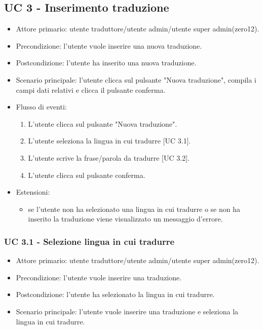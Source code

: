 \subsection{UC 3 - Inserimento traduzione}
    \begin{itemize}
        \item Attore primario: utente traduttore/utente admin/utente super admin(zero12).
        \item Precondizione: l'utente vuole inserire una nuova traduzione.
        \item Postcondizione: l'utente ha inserito una nuova traduzione.
        \item Scenario principale: l'utente clicca sul pulsante "Nuova traduzione", compila i campi dati relativi e clicca il pulsante conferma.
        \item Flusso di eventi:
            \begin{enumerate}
                \item L'utente clicca sul pulsante "Nuova traduzione".
                \item L'utente seleziona la lingua in cui tradurre [UC 3.1].
                \item L'utente scrive la frase/parola da tradurre [UC 3.2].
                \item L'utente clicca sul pulsante conferma.
            \end{enumerate}
        \item Estensioni:
        \begin{itemize}
            \item se l'utente non ha selezionato una lingua in cui tradurre o se non ha inserito la traduzione viene visualizzato un messaggio d'errore.
        \end{itemize}
    \end{itemize}
    \subsubsection{UC 3.1 - Selezione lingua in cui tradurre}
        \begin{itemize}
            \item Attore primario: utente traduttore/utente admin/utente super admin(zero12).
            \item Precondizione: l'utente vuole inserire una traduzione.
            \item Postcondizione: l'utente ha selezionato la lingua in cui tradurre.
            \item Scenario principale: l'utente vuole inserire una traduzione e seleziona la lingua in cui tradurre.
        \end{itemize}
